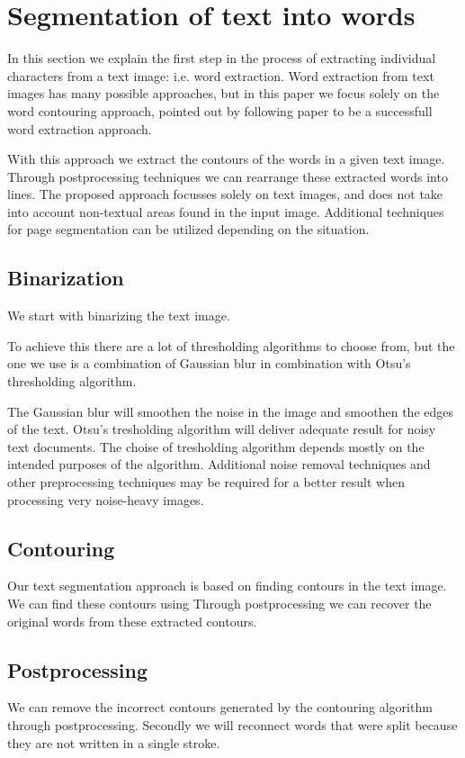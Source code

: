 \documentclass{article}
\begin{document}
\section{Segmentation of text into words}
\label{sec:segtext}
In this section we explain the first step in the process of extracting individual characters from a text image: i.e. word extraction.
Word extraction from text images has many possible approaches, but in this paper we focus solely on the word contouring approach, pointed out by following paper \cite{WordSegm} to be a successfull word extraction approach.

With this approach we extract the contours of the words in a given text image. Through postprocessing techniques we can rearrange these extracted words into lines.
The proposed approach focusses solely on text images, and does not take into account non-textual areas found in the input image.
Additional techniques for page segmentation can be utilized depending on the situation.

\subsection{Binarization}
We start with binarizing the text image.

To achieve this there are a lot of thresholding algorithms to choose from, but the one we use is a combination of Gaussian blur in combination with Otsu's thresholding algorithm.

The Gaussian blur will smoothen the noise in the image and smoothen the edges of the text.
Otsu's tresholding algorithm will deliver adequate result for noisy text documents.
The choise of tresholding algorithm depends mostly on the intended purposes of the algorithm.
Additional noise removal techniques and other preprocessing techniques may be required for a better result when processing very noise-heavy images.


\subsection{Contouring}
Our text segmentation approach is based on finding contours in the text image.
We can find these contours using %
Through postprocessing we can recover the original words from these extracted contours.

\subsection{Postprocessing}
We can remove the incorrect contours generated by the contouring algorithm through postprocessing.
Secondly we will reconnect words that were split because they are not written in a single stroke.
\end{document}
